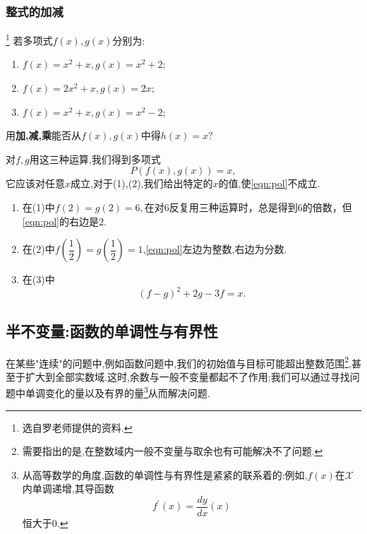 \subsubsection{整式的加减}
\begin{problem}\footnote{选自罗老师提供的资料.}
    若多项式$f(x),g(x)$分别为:
    \begin{enumerate}
        \item $f(x)=x^2+x,g(x)=x^2+2;$
        \item $f(x)=2x^2+x,g(x)=2x;$
        \item $f(x)=x^2+x,g(x)=x^2-2;$
    \end{enumerate}
    用\textbf{加,减,乘}能否从$f(x),g(x)$中得$h(x)=x?$
\end{problem}
\begin{solution}
    对$f,g$用这三种运算,我们得到多项式\begin{equation}\label{eqn:pol}
        P(f(x),g(x))=x,
    \end{equation}
    它应该对任意$x$成立,对于(1),(2),我们给出特定的$x$的值,使\eqref{eqn:pol}不成立.
    \begin{enumerate}
        \item 在(1)中$f(2)=g(2)=6,$在对6反复用三种运算时，总是得到6的倍数，但\eqref{eqn:pol}的右边是2.
        \item 在(2)中$f(\dfrac{1}{2})=g(\dfrac12)=1$,\eqref{eqn:pol}左边为整数,右边为分数.
        \item 在(3)中$$(f-g)^2+2g-3f=x.$$
    \end{enumerate}
    
    
\end{solution}

\subsection{半不变量:函数的单调性与有界性}
在某些"连续"的问题中,例如函数问题中,我们的初始值与目标可能超出整数范围\footnote{需要指出的是,在整数域内一般不变量与取余也有可能解决不了问题.},甚至于扩大到全部实数域.这时,余数与一般不变量都起不了作用;我们可以通过寻找问题中单调变化的量以及有界的量\footnote{从高等数学的角度,函数的单调性与有界性是紧紧的联系着的:例如,$f(x)$在$\mathcal{X}$内单调递增,其导函数$$f^{\prime}(x)=\dfrac{dy
}{dx}(x)$$恒大于0.}从而解决问题.

